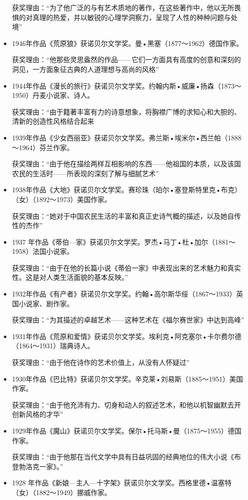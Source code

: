 \documentclass[UTF8,a4paper,8pt]{ctexbook}
\begin{document}
\begin{itemize}
			获奖理由：“为了他广泛的与有艺术质地的著作，在这些著作中，他以无所畏惧的对真理的热爱，并以敏锐的心理学洞察力，呈现了人性的种种问题与处境”
			\item 1946年作品《荒原狼》获诺贝尔文学奖。曼•黑塞（1877～1962）德国作家。
			
			获奖理由：“他那些灵思盎然的作品——它们一方面具有高度的创意和深刻的洞见，一方面象征古典的人道理想与高尚的风格”
			\item 1944年作品《漫长的旅行》获诺贝尔文学奖。约翰内斯•威廉•扬森（1873～1950）丹麦小说家、诗人。
			
			获奖理由：“由于籍著丰富有力的诗意想象，将胸襟广博的求知心和大胆的、清新的创造性风格结合起来
			\item 1939年作品《少女西丽亚》获诺贝尔文学奖。弗兰斯•埃米尔•西兰帕（1888～1964）芬兰作家。
			
			获奖理由：“由于他在描绘两样互相影响的东西——他祖国的本质，以及该国农民的生活时——所表现的深刻了解与细腻艺术”
			\item 1938年作品《大地》获诺贝尔文学奖。赛珍珠（珀尔•塞登斯特里克•布克）（女）（1892～1973）美国作家。
			
			获奖理由：“她对于中国农民生活的丰富和真正史诗气概的描述，以及她自传性的杰作”
			\item 1937 年作品《蒂伯—家》获诺贝尔文学奖。罗杰•马丁•杜•加尔（1881～1958）法国小说家。
			
			获奖理由：“由于在他的长篇小说《蒂伯一家》中表现出来的艺术魅力和真实性。这是对人类生活面貌的基本反映。”
			\item 1932年作品《有产者》获诺贝尔文学奖。约翰•高尔斯华绥（1867～1933）英国小说家、剧作家。
			
			获奖理由：“为其描述的卓越艺术——这种艺术在《福尔赛世家》中达到高峰”
			\item 1931年作品《荒原和爱情》获诺贝尔文学奖。埃利克•阿克塞尔•卡尔费尔德（1864～1931）瑞典诗人。
			
			获奖理由：“由于他在诗作的艺术价值上，从没有人怀疑过”
			\item 1930年作品《巴比特》获诺贝尔文学奖。辛克莱•刘易斯（1885～1951）美国作家。
			
			获奖理由：“由于他充沛有力、切身和动人的叙述艺术，和他以机智幽默去开创新风格的才华”
			\item 1929年作品《魔山》获诺贝尔文学奖。保尔•托马斯•曼（1875～1955）德国作家。
			
			获奖理由：“由于他那在当代文学中具有日益巩固的经典地位的伟大小说《布登勃洛克一家》。”
			\item 1928 年作品《新娘—主人—十字架》获诺贝尔文学奖。西格里德•温塞特（女）（1882～1949）挪威作家。
			

\end{itemize}
\end{document}
